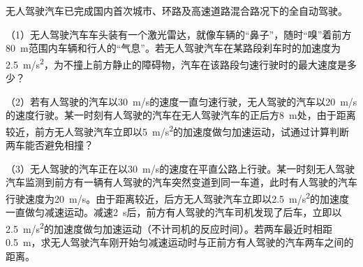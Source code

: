 无人驾驶汽车已完成国内首次城市、环路及高速道路混合路况下的全自动驾驶。
  
  （1）无人驾驶汽车车头装有一个激光雷达，就像车辆的“鼻子”，随时“嗅”着前方\qty{80}{m}范围内车辆和行人的“气息”。若无人驾驶汽车在某路段刹车时的加速度为\qty{2.5}{m/s^2}，为不撞上前方静止的障碍物，汽车在该路段匀速行驶时的最大速度是多少？

  （2）若有人驾驶的汽车以\qty{30}{m/s}的速度一直匀速行驶，无人驾驶的汽车以\qty{20}{m/s}的速度行驶。某一时刻有人驾驶的汽车在无人驾驶汽车的正后方\qty{8}{m}处，由于距离较近，前方无人驾驶汽车立即以\qty{5}{m/s^2}的加速度做匀加速运动，试通过计算判断两车能否避免相撞？

  （3）无人驾驶的汽车正在以\qty{30}{m/s}的速度在平直公路上行驶。某一时刻无人驾驶汽车监测到前方有一辆有人驾驶的汽车突然变道到同一车道，此时有人驾驶的汽车行驶速度为\qty{20}{m/s}。由于距离较近，后方无人驾驶汽车立即以\qty{2.5}{m/s^2}的加速度一直做匀减速运动。减速\qty{2}{s}后，前方有人驾驶的汽车司机发现了后车，立即以\qty{2.5}{m/s^2}的加速度做匀加速运动（不计司机的反应时间）。若两车最近时相距\qty{0.5}{m}，求无人驾驶汽车刚开始匀减速运动时与正前方有人驾驶的汽车两车之间的距离。
